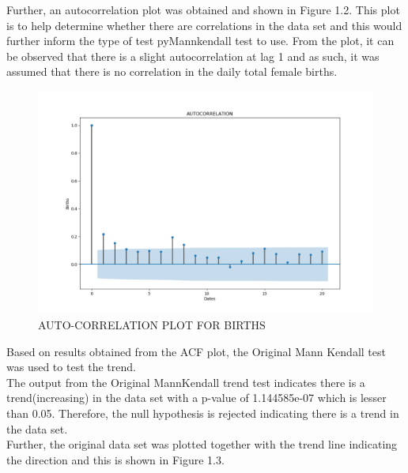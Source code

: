 \documentclass[12pt, letterpaper, twoside]{article}
\begin{document}
Further, an  autocorrelation plot was obtained and shown in Figure 1.2. This plot is to help determine whether there are correlations in the data set and this would further inform the type of test pyMannkendall test to use. From the plot, it can be observed that there is a slight autocorrelation at lag 1 and as such, it was assumed that there is no correlation in the daily total female births.\\
\begin{figure}[bp!]
	    \centering
	        \includegraphics[width=1\textwidth]{BIRTH_DATA_ACF_PLOT.png}
                    \caption{AUTO-CORRELATION PLOT FOR BIRTHS}
			\label{fig:1.1}                                                                                                                                 \end{figure}


Based on results obtained from the ACF plot, the Original Mann Kendall test was used to test the trend.\\

The output from the Original MannKendall trend test indicates there is a trend(increasing) in the data set with a p-value of 1.144585e-07 which is lesser than 0.05. Therefore, the null hypothesis is rejected indicating there is a trend in the data set.\\ Further, the original data set was plotted together with the trend line indicating the direction and this is shown in Figure 1.3.
\end{document}
